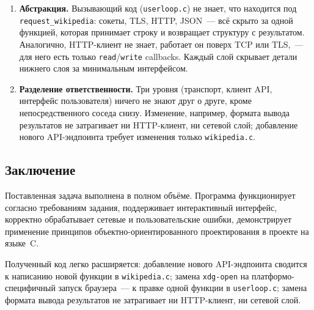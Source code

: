 \documentclass[12pt]{extarticle}
\begin{document}
\begin{enumerate}
    \item \textbf{Абстракция.} Вызывающий код
          (\texttt{userloop.c}) не знает, что находится под
          \texttt{request\_wikipedia}: сокеты, TLS, HTTP,
          JSON~--- всё скрыто за одной функцией, которая
          принимает строку и возвращает структуру с
          результатом. Аналогично, HTTP-клиент не знает,
          работает он поверх TCP или TLS,~--- для него есть
          только \texttt{read}/\texttt{write} callbacks.
          Каждый слой скрывает детали нижнего слоя за
          минимальным интерфейсом.

    \item \textbf{Разделение ответственности.} Три уровня
          (транспорт, клиент API, интерфейс пользователя)
          ничего не знают друг о друге, кроме
          непосредственного соседа снизу. Изменение,
          например, формата вывода результатов не затрагивает
          ни HTTP-клиент, ни сетевой слой; добавление нового
          API-эндпоинта требует изменения только
          \texttt{wikipedia.c}.
\end{enumerate}

\subsection*{Заключение}

Поставленная задача выполнена в полном объёме. Программа
функционирует согласно требованиям задания, поддерживает
интерактивный интерфейс, корректно обрабатывает сетевые и
пользовательские ошибки, демонстрирует применение принципов
объектно-ориентированного проектирования в проекте на языке~C.

Полученный код легко расширяется: добавление нового
API-эндпоинта сводится к написанию новой функции в
\texttt{wikipedia.c}; замена \texttt{xdg-open} на
платформо-специфичный запуск браузера~--- к правке одной
функции в \texttt{userloop.c}; замена формата вывода
результатов не затрагивает ни HTTP-клиент, ни сетевой слой.
\end{document}
